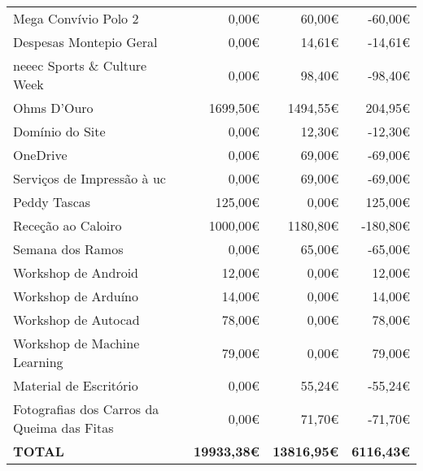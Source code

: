 \begin{longtable}{Xrrr}
Mega Convívio Polo 2 & 0,00€ & 60,00€ & -60,00€ \\

Despesas Montepio Geral & 0,00€ & 14,61€ & -14,61€ \\

\acrshort{neeec} Sports \& Culture Week & 0,00€ & 98,40€ & -98,40€ \\

Ohms D'Ouro & 1699,50€ & 1494,55€ & 204,95€ \\

Domínio do Site & 0,00€ & 12,30€ & -12,30€ \\

OneDrive & 0,00€ & 69,00€ & -69,00€ \\

Serviços de Impressão à \acrshort{uc} & 0,00€ & 69,00€ & -69,00€ \\

Peddy Tascas & 125,00€ & 0,00€ & 125,00€ \\

Receção ao Caloiro & 1000,00€ & 1180,80€ & -180,80€ \\

Semana dos Ramos & 0,00€ & 65,00€ & -65,00€ \\

Workshop de Android & 12,00€ & 0,00€ & 12,00€ \\

Workshop de Arduíno & 14,00€ & 0,00€ & 14,00€ \\

Workshop de Autocad & 78,00€ & 0,00€ & 78,00€ \\

Workshop de Machine Learning & 79,00€ & 0,00€ & 79,00€ \\

Material de Escritório & 0,00€ & 55,24€ & -55,24€ \\

Fotografias dos Carros da Queima das Fitas & 0,00€ & 71,70€ & -71,70€ \\

\midrule \midrule

\bfseries TOTAL & \bfseries 19933,38€ & \bfseries 13816,95€ & \bfseries 6116,43€ \\


\end{longtable}